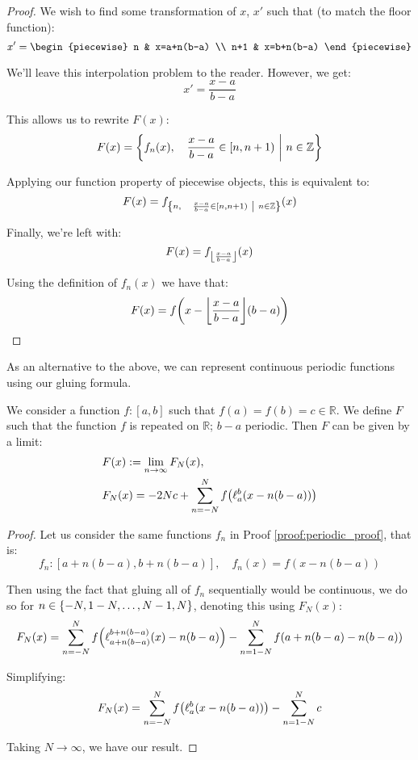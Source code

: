 \begin{theorem}
\begin{proof}
        We wish to find some transformation of $x$, $x'$ such that (to match the floor function):
        $$
            x' = \begin{piecewise}
                n & x=a+n(b-a) \\
                n+1 & x=b+n(b-a)
            \end{piecewise}
        $$

        We'll leave this interpolation problem to the reader. However, we get:
        $$
            x'=\frac{x-a}{b-a}
        $$

        This allows us to rewrite $F(x)$:
        $$
            F(x) = \pwobj{f_n(x)}{\frac{x-a}{b-a}\in[n,n+1)}{n\in\mathbb{Z}}
        $$

        Applying our function property of piecewise objects, this is equivalent to:
        $$
            F(x) = f_{\pwobj{n}{\frac{x-a}{b-a}\in[n,n+1)}{n\in\mathbb{Z}}}(x)
        $$

        Finally, we're left with:
        $$
            F(x) = f_{\floor*{\frac{x-a}{b-a}}}(x)
        $$

        Using the definition of $f_n(x)$ we have that:
        $$
            F(x) = f\paren*{x-\floor*{\frac{x-a}{b-a}}(b-a)}
        $$
    \end{proof}
\end{theorem}

As an alternative to the above, we can represent continuous periodic functions using our gluing formula.

\begin{theorem}
    We consider a function $f:[a,b]$ such that $f(a)=f(b)=c\in\mathbb{R}$. We define $F$ such that the function $f$ is repeated on $\mathbb{R}$; $b-a$ periodic. Then $F$ can be given by a limit:
    \begin{align*}
        & F(x) := \lim_{n\to\infty}{F_N(x)}, \\
        & F_N(x) = -2Nc +\sum_{n=-N}^{N}{f\paren*{\ell_{a}^{b}(x-n(b-a))}}
    \end{align*}

    \begin{proof}
        Let us consider the same functions $f_n$ in Proof \ref{proof:periodic_proof}, that is:
        $$
            f_n:[a+n(b-a),b+n(b-a)],\quad f_n(x)=f(x-n(b-a))
        $$

        Then using the fact that gluing all of $f_n$ sequentially would be continuous, we do so for $n\in\br*{-N,1-N,\dots,N-1,N}$, denoting this using $F_N(x)$:
        $$
            F_N(x) = \sum_{n=-N}^{N}{f\paren*{\ell_{a+n(b-a)}^{b+n(b-a)}(x)-n(b-a)}}-\sum_{n=1-N}^{N}{f\paren*{a+n(b-a)-n(b-a)}}
        $$

        Simplifying:
        $$
            F_N(x) = \sum_{n=-N}^{N}{f\paren*{\ell_{a}^{b}(x-n(b-a))}}-\sum_{n=1-N}^{N}{c}
        $$

        Taking $N\to\infty$, we have our result.
    \end{proof}
\end{theorem}

\newpage